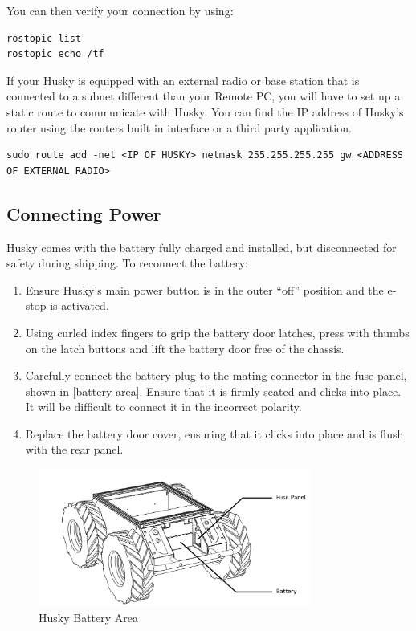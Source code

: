 \documentclass[]{clearpath-latex/clearpath-manual}
\begin{document}
You can then verify your connection by using:

\begin{lstlisting}
rostopic list
rostopic echo /tf
\end{lstlisting}

If your Husky is equipped with an external radio or base station that is connected to a subnet different than your Remote PC, 
you will have to set up a static route to communicate with Husky. You can find the IP address of Husky’s 
router using the routers built in interface or a third party application.
\begin{lstlisting} 
sudo route add -net <IP OF HUSKY> netmask 255.255.255.255 gw <ADDRESS OF EXTERNAL RADIO>
\end{lstlisting}

\newpage

\subsection{Connecting Power}
Husky comes with the battery fully charged and installed, but disconnected for safety during shipping. 
To reconnect the battery:

\begin{enumerate}
	\item Ensure Husky’s main power button is in the outer “off” position and the e-stop is activated.
	\item Using curled index fingers to grip the battery door latches, press with thumbs on the latch buttons and lift the battery door free of the chassis.
	\item Carefully connect the battery plug to the mating connector in the fuse panel, shown in \autoref{battery-area}. Ensure that it is firmly seated and clicks into place. It will be difficult to connect it in the incorrect polarity.
	\item Replace the battery door cover, ensuring that it clicks into place and is flush with the rear panel.
\end{enumerate}

\begin{figure}[h]
	\centering
	\includegraphics[width=0.8\textwidth]{battery-area.png}
	\caption{Husky Battery Area}
	\label{battery-area}
\end{figure}
\end{document}
